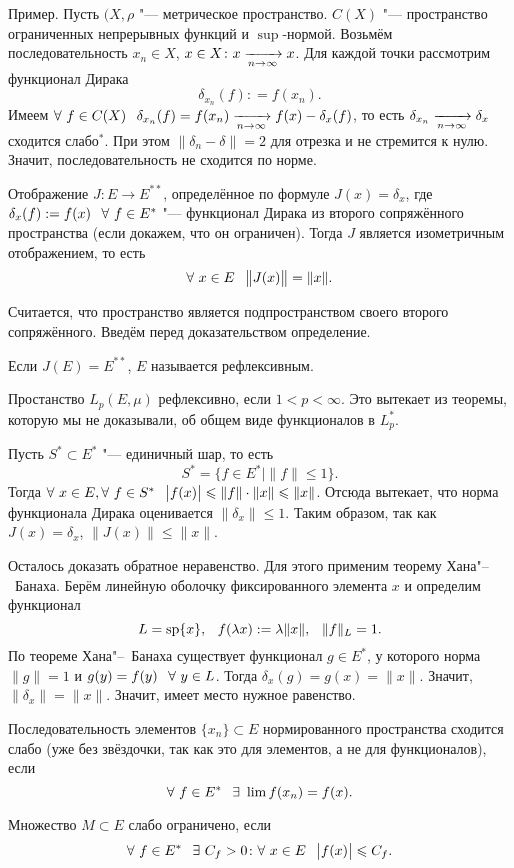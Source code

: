 Пример. Пусть $(X,\rho$ "--- метрическое пространство. $C(X)$ "--- пространство ограниченных непрерывных функций и $\sup$-нормой. Возьмём последовательность $x_n\in X$, $x\in X\colon x\xrightarrow[n\rightarrow\infty]{} x$. Для каждой точки рассмотрим функционал Дирака
\[
  \delta_{x_n}(f) : = f(x_n).
\]
Имеем $\forall\ f\in C(X)\hskip .75em plus.1em minus.08em\relax \delta_{x_n}(f) = f(x_n)\xrightarrow[n\rightarrow\infty]{} f(x) - \delta_x(f)$, то есть $\delta_{x_n}\xrightarrow[n\rightarrow\infty]{} \delta_x$ сходится слабо${}^*$. При этом $\|\delta_n-\delta\| = 2$ для отрезка  и не стремится к нулю. Значит, последовательность не сходится по норме.
\begin{The}
  Отображение $J\colon E\to E^{**}$, определённое по формуле $J(x) = \delta_x$, где $\delta_x(f) := f(x)\pau\forall\ f\in E^*$ "--- функционал Дирака из второго сопряжённого пространства (если докажем, что он ограничен). Тогда $J$ является изометричным отображением, то есть
\[
  \forall\ x\in E\pau \big\|J(x)\big\| = \|x\|.
\]
\end{The}
Считается, что пространство является подпространством своего второго сопряжённого. Введём перед доказательством определение.
\begin{Def}
  Если $J(E) = E^{**}$, $E$ называется рефлексивным.
\end{Def}
Простанство $L_p(E,\mu)$ рефлексивно, если $1<p<\infty$. Это вытекает из теоремы, которую мы не доказывали, об общем виде функционалов в $L^*_p$.
\begin{Proof}
  Пусть $S^*\subset E^*$ "--- единичный шар, то есть
\[
  S^* = \big\{f\in E^*\big|\|f\|\le 1\big\}.
\]
Тогда $\forall\ x\in E,\forall\ f\in S^*\hskip .75em plus.1em minus.08em\relax \big|f(x)\big|\leqslant \|f\|\cdot \|x\|\leqslant \|x\|$. Отсюда вытекает, что норма функционала Дирака оценивается $\|\delta_x\|\le 1$. Таким образом, так как $J(x) = \delta_x$, $\big\|J(x)\big\|\le \|x\|$.

Осталось доказать обратное неравенство. Для этого применим теорему Хана"--~Банаха. Берём линейную оболочку фиксированного элемента $x$ и определим функционал
\[
  L = \sP\{x\},\pau f(\lambda x ): = \lambda\|x\|,\pau \|f\|_L=1.
\]
По теореме Хана"--~Банаха существует функционал $g\in E^*$, у которого норма $\|g\| = 1$ и $g(y) = f(y)\pau \forall\ y\in L$. Тогда $\delta_x(g) = g(x) = \|x\|$. Значит, $\|\delta_x\|= \|x\|$. Значит, имеет место нужное равенство.
\end{Proof}

\begin{Def}
  Последовательность элементов $\{x_n\}\subset E$ нормированного пространства сходится слабо (уже без звёздочки, так как это для элементов, а не для функционалов), если 
\[
  \forall\ f\in E^*\pau \exists\ \lim f(x_n) = f(x).
\]

Множество $M\subset E$ слабо ограничено, если
\[
  \forall\ f\in E^*\pau \exists\ C_f>0\colon \forall\ x\in E\pau \big|f(x)\big|\le C_f.
\]
\end{Def}

